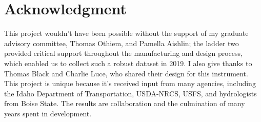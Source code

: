 \chapter*{Acknowledgment}

This project wouldn't have been possible without the support of my graduate advisory committee, Thomas Othiem, and Pamella Aishlin; the ladder two provided critical support throughout the manufacturing and design process, which enabled us to collect such a robust dataset in 2019. I also give thanks to Thomas Black and Charlie Luce, who shared their design for this instrument. This project is unique because it's received input from many agencies, including the Idaho Department of Transportation, USDA-NRCS, USFS, and hydrologists from Boise State. The results are collaboration and the culmination of many years spent in development. 